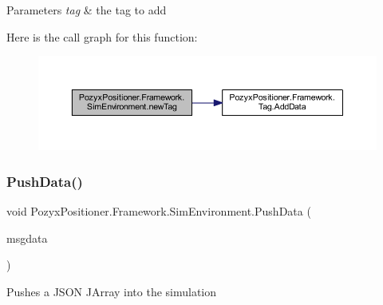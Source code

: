 \begin{DoxyParams}{Parameters}
{\em tag} & the tag to add\\
\hline
\end{DoxyParams}
Here is the call graph for this function\+:\nopagebreak
\begin{figure}[H]
\begin{center}
\leavevmode
\includegraphics[width=350pt]{class_pozyx_positioner_1_1_framework_1_1_sim_environment_ae804be21b53900cbac13c0cce385b170_cgraph}
\end{center}
\end{figure}
\mbox{\label{class_pozyx_positioner_1_1_framework_1_1_sim_environment_a94e341475ddb03c2c27dd253748ad65a}} 
\subsubsection{\texorpdfstring{Push\+Data()}{PushData()}}
{\footnotesize\ttfamily void Pozyx\+Positioner.\+Framework.\+Sim\+Environment.\+Push\+Data (\begin{DoxyParamCaption}\item[{J\+Array}]{msgdata }\end{DoxyParamCaption})}



Pushes a J\+S\+ON J\+Array into the simulation 


